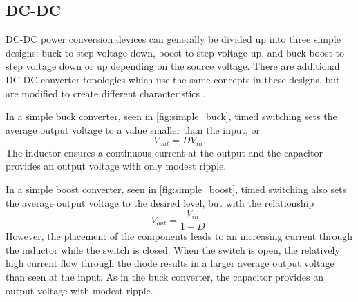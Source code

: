 
\subsection{DC-DC}
DC-DC power conversion devices can generally be divided up into three simple designs: buck to step voltage down, boost to step voltage up, and buck-boost to step voltage down or up depending on the source voltage. 
There are additional DC-DC converter topologies which use the same concepts in these designs, but are modified to create different characteristics \cite{Mohan2003}.

In a simple buck converter, seen in \autoref{fig:simple_buck}, timed switching sets the average output voltage to a value smaller than the input, or 
\begin{equation}
V_{out} = D V_{in}. 
\end{equation}
The inductor ensures a continuous current at the output and the capacitor provides an output voltage with only modest ripple. 



In a simple boost converter, seen in \autoref{fig:simple_boost}, timed switching also sets the average output voltage to the desired level, but with the relationship 
\begin{equation}
V_{out} =\frac{V_{in}}{1-D}. 
\end{equation}
However, the placement of the components leads to an increasing current through the inductor while the switch is closed. When the switch is open, the relatively high current flow through the diode results in a larger average output voltage than seen at the input. As in the buck converter, the capacitor provides an output voltage with modest ripple. 

